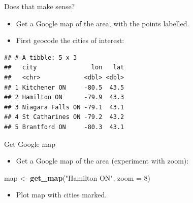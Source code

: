 \documentclass[ignorenonframetext,]{beamer}
\newenvironment{Shaded}{\begin{snugshade}}{\end{snugshade}}
\newcommand{\DataTypeTok}[1]{\textcolor[rgb]{0.13,0.29,0.53}{#1}}
\newcommand{\DecValTok}[1]{\textcolor[rgb]{0.00,0.00,0.81}{#1}}
\newcommand{\KeywordTok}[1]{\textcolor[rgb]{0.13,0.29,0.53}{\textbf{#1}}}
\newcommand{\NormalTok}[1]{#1}
\newcommand{\OperatorTok}[1]{\textcolor[rgb]{0.81,0.36,0.00}{\textbf{#1}}}
\newcommand{\StringTok}[1]{\textcolor[rgb]{0.31,0.60,0.02}{#1}}
\providecommand{\tightlist}{%
  \setlength{\itemsep}{0pt}\setlength{\parskip}{0pt}}
\begin{document}
\begin{frame}[fragile]{Does that make sense?}
\protect\hypertarget{does-that-make-sense}{}

\begin{itemize}
\item
  Get a Google map of the area, with the points labelled.
\item
  First geocode the cities of interest:
\end{itemize}

\footnotesize

\begin{Shaded}
\end{Shaded}

\begin{verbatim}
## # A tibble: 5 x 3
##   city               lon   lat
##   <chr>            <dbl> <dbl>
## 1 Kitchener ON     -80.5  43.5
## 2 Hamilton ON      -79.9  43.3
## 3 Niagara Falls ON -79.1  43.1
## 4 St Catharines ON -79.2  43.2
## 5 Brantford ON     -80.3  43.1
\end{verbatim}

\normalsize

\end{frame}

\begin{frame}[fragile]{Get Google map}
\protect\hypertarget{get-google-map}{}

\begin{itemize}
\tightlist
\item
  Get a Google map of the area (experiment with zoom):
\end{itemize}

\begin{Shaded}
\begin{Highlighting}[]
\NormalTok{map <-}\StringTok{ }\KeywordTok{get_map}\NormalTok{(}\StringTok{"Hamilton ON"}\NormalTok{, }\DataTypeTok{zoom =} \DecValTok{8}\NormalTok{)}
\end{Highlighting}
\end{Shaded}

\begin{itemize}
\tightlist
\item
  Plot map with cities marked.
\end{itemize}

\end{frame}
\end{document}
